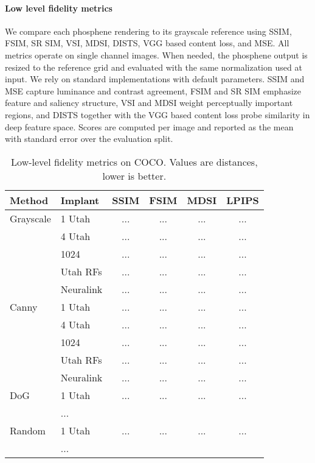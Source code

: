 \paragraph{Low level fidelity metrics}
We compare each phosphene rendering to its grayscale reference using SSIM, FSIM, SR SIM, VSI, MDSI, DISTS, VGG based content loss, and MSE. All metrics operate on single channel images. When needed, the phosphene output is resized to the reference grid and evaluated with the same normalization used at input. We rely on standard implementations with default parameters. SSIM and MSE capture luminance and contrast agreement, FSIM and SR SIM emphasize feature and saliency structure, VSI and MDSI weight perceptually important regions, and DISTS together with the VGG based content loss probe similarity in deep feature space. Scores are computed per image and reported as the mean with standard error over the evaluation split.


\begin{table}[t]
\centering
\small
\caption{Low-level fidelity metrics on COCO. Values are distances, lower is better.}
\label{tab:low_coco}
\begin{tabular}{llcccc}
\toprule
Method & Implant & SSIM & FSIM & MDSI & LPIPS \\
\midrule
Grayscale & 1 Utah & ... & ... & ... & ... \\
          & 4 Utah & ... & ... & ... & ... \\
          & 1024   & ... & ... & ... & ... \\
          & Utah RFs & ... & ... & ... & ... \\
          & Neuralink & ... & ... & ... & ... \\
\midrule
Canny     & 1 Utah & ... & ... & ... & ... \\
          & 4 Utah & ... & ... & ... & ... \\
          & 1024   & ... & ... & ... & ... \\
          & Utah RFs & ... & ... & ... & ... \\
          & Neuralink & ... & ... & ... & ... \\
\midrule
DoG       & 1 Utah & ... & ... & ... & ... \\
          & ...    &     &     &     &     \\
\midrule
Random    & 1 Utah & ... & ... & ... & ... \\
          & ...    &     &     &     &     \\
\bottomrule
\end{tabular}
\end{table}




